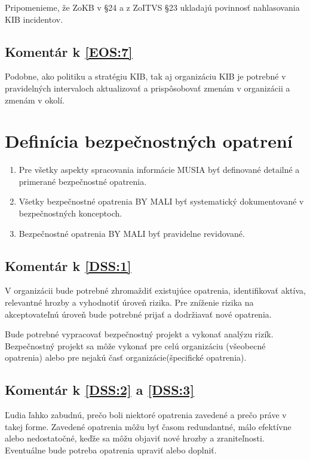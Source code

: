 Pripomenieme, že \acrshort{ZoKB} v \S 24 a z \acrshort{ZoITVS} \S 23 ukladajú povinnosť nahlasovania KIB incidentov.

\subsection*{Komentár k \ref{EOS:7}}
Podobne, ako politiku a stratégiu KIB, tak aj organizáciu KIB je potrebné v pravidelných intervaloch aktualizovať a
prispôsobovať zmenám v organizácii a zmenám v okolí.

\section{Definícia bezpečnostných opatrení}
\begin{enumerate}
  \item \label{DSS:1} Pre všetky aspekty spracovania informácie MUSIA byť definované detailné a primerané bezpečnostné opatrenia.
  \item \label{DSS:2} Všetky bezpečnostné opatrenia BY MALI byť systematický dokumentované v bezpečnostných konceptoch.
  \item \label{DSS:3} Bezpečnostné opatrenia BY MALI byť pravidelne revidované.
\end{enumerate}

\subsection*{Komentár k \ref{DSS:1}}
V organizácii bude potrebné zhromaždiť existujúce opatrenia, identifikovať aktíva, relevantné hrozby a vyhodnotiť úroveň
rizika. Pre zníženie rizika na akceptovateľnú úroveň bude potrebné prijať a dodržiavať nové opatrenia. 

Bude potrebné vypracovať bezpečnostný projekt a vykonať analýzu rizík. Bezpečnostný projekt sa môže vykonať pre celú organizáciu
(všeobecné opatrenia) alebo pre nejakú časť organizácie(špecifické opatrenia). 

\subsection*{Komentár k \ref{DSS:2} a \ref{DSS:3}}
Ľudia ľahko zabudnú, prečo boli niektoré opatrenia zavedené a prečo práve v takej forme. Zavedené opatrenia môžu byť časom
redundantné, málo efektívne alebo nedostatočné, keďže sa môžu objaviť nové hrozby a zraniteľnosti. Eventuálne bude potreba
opatrenia upraviť alebo doplniť.


